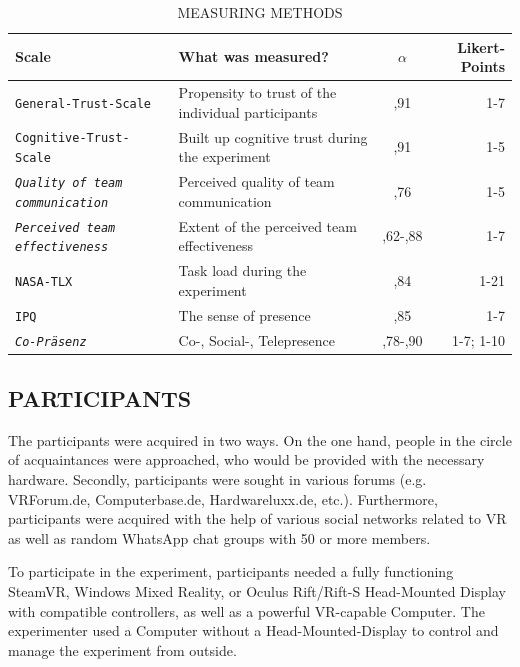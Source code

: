 \documentclass[sigchi]{acmart}
\begin{document}
\begin{table}
  \caption{MEASURING METHODS}
  \label{questionnaires}
  \begin{tabular}{llcr}
    \toprule
    Scale & What was measured? & $\alpha$ & Likert-Points \\
    \midrule
    \texttt{General-Trust-Scale \citep{couch1996assessment}} & Propensity to trust of the individual participants & ,91 & 1-7 \\
    
    \texttt{Cognitive-Trust-Scale \citep[p. 37]{mcallister1995affect}} &Built up cognitive trust during the experiment & ,91 & 1-5\\
    
     \texttt{\textit{Quality of team communication} \citep[p. 1049]{gonzalez2014climate}} & Perceived quality of team communication & ,76 & 1-5 \\
     
      \texttt{\textit{Perceived team effectiveness}\citep[p. 469]{gibson2003team}} & Extent of the perceived team effectiveness & ,62-,88 & 1-7\\
          
       \texttt{NASA-TLX\citep{NASATLX}} & Task load during the experiment & ,84 &1-21  \\
       
       \texttt{IPQ \citep{IPQ}} & The sense of presence & ,85 & 1-7 \\
       
        \texttt{\textit{Co-Präsenz} \citep[p. 487]{nowak2003effect}} &  Co-, Social-, Telepresence & ,78-,90 & 1-7; 1-10 \\
    \bottomrule
  \end{tabular}
\end{table}

\subsection{PARTICIPANTS}

The participants were acquired in two ways. On the one hand, people in the circle of acquaintances were approached, who would be provided with the necessary hardware. Secondly, participants were sought in various forums (e.g. VRForum.de, Computerbase.de, Hardwareluxx.de, etc.). Furthermore, participants were acquired with the help of various social networks related to VR as well as random WhatsApp chat groups with 50 or more members.

To participate in the experiment, participants needed a fully functioning SteamVR, Windows Mixed Reality, or Oculus Rift/Rift-S Head-Mounted Display with compatible controllers, as well as a powerful VR-capable Computer. The experimenter used a Computer without a Head-Mounted-Display to control and manage the experiment from outside.
\end{document}
